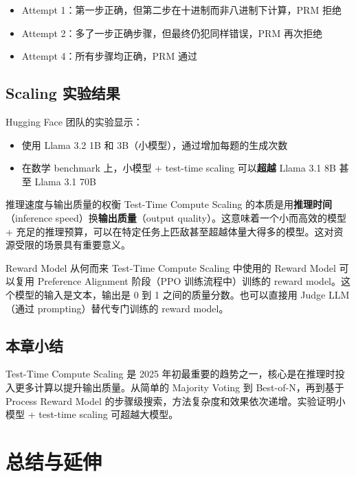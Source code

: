 \documentclass[a4paper]{article}
\begin{document}
\begin{itemize}
    \item Attempt 1：第一步正确，但第二步在十进制而非八进制下计算，PRM 拒绝
    \item Attempt 2：多了一步正确步骤，但最终仍犯同样错误，PRM 再次拒绝
    \item Attempt 4：所有步骤均正确，PRM 通过
\end{itemize}

\subsection{Scaling 实验结果}

Hugging Face 团队的实验显示：

\begin{itemize}
    \item 使用 Llama 3.2 1B 和 3B（小模型），通过增加每题的生成次数
    \item 在数学 benchmark 上，小模型 + test-time scaling 可以\textbf{超越} Llama 3.1 8B 甚至 Llama 3.1 70B
\end{itemize}

\begin{importantbox}{推理速度与输出质量的权衡}
Test-Time Compute Scaling 的本质是用\textbf{推理时间}（inference speed）换\textbf{输出质量}（output quality）。这意味着一个小而高效的模型 + 充足的推理预算，可以在特定任务上匹敌甚至超越体量大得多的模型。这对资源受限的场景具有重要意义。
\end{importantbox}

\begin{knowledgebox}{Reward Model 从何而来}
Test-Time Compute Scaling 中使用的 Reward Model 可以复用 Preference Alignment 阶段（PPO 训练流程中）训练的 reward model。这个模型的输入是文本，输出是 0 到 1 之间的质量分数。也可以直接用 Judge LLM（通过 prompting）替代专门训练的 reward model。
\end{knowledgebox}

\subsection{本章小结}

Test-Time Compute Scaling 是 2025 年初最重要的趋势之一，核心是在推理时投入更多计算以提升输出质量。从简单的 Majority Voting 到 Best-of-N，再到基于 Process Reward Model 的步骤级搜索，方法复杂度和效果依次递增。实验证明小模型 + test-time scaling 可超越大模型。

\newpage
\section{总结与延伸}
\end{document}
